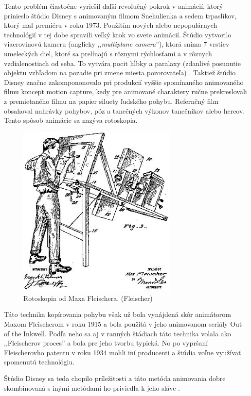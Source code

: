 Tento problém čiastočne vyriešil daľší revolučný pokrok v animácií, ktorý prinieslo štúdio Disney s animovaným filmom Snehulienka a sedem trpaslíkov, ktorý mal premiéru v roku 1973. Použitím nových alebo nepopulárnych technológií v tej dobe spravili veľký krok vo svete animácií. Štúdio vytvorilo viacrovinovú kameru (anglicky ,,\textit{multiplane camera}''), ktorá sníma 7 vrstiev umeleckých diel, ktoré sa prelínajú s rôznymi rýchlosťami a v rôznych vzdialenostiach od seba. To vytvára pocit hĺbky a paralaxy (zdanlivé posunutie objektu vzhľadom na pozadie pri zmene miesta pozorovateľa) \cite{multiplaneCam}. 
Taktiež štúdio Disney značne zakompononovalo pri produkcií vyššie spomínaného animovaného filmu koncept motion capture, kedy pre animované charaktery ručne prekreslovali z premietaného filmu na papier siluety ľudského pohybu. Refernčný film obsahoval nahrávky pohybov, póz a tanečných výkonov tanečníkov alebo hercov. Tento spôsob animácie sa nazýva rotoskopia.

\begin{figure}[!htbp]
  \centering
  \includegraphics[width=8cm]{img/Rotoscoping-by-Max-Fleischer-Fleischer.png}
  \caption{Rotoskopia od Maxa Fleischera. (Fleischer)}
  \label{rotoscopeFig}
\end{figure}

Táto technika kopírovania pohybu však už bola vynájdená skôr animátorom Maxom Fleischerom v roku 1915 a bola použitá v jeho animovanom seriály Out of the Inkwell. Podľa neho sa aj v ranných štádiach táto technika volala ako ,,Fleischerov proces'' a bola pre jeho tvorbu typická. No po vypršaní Fleischerovho patentu v roku 1934 mohli iní producenti a štúdia voľne využívať spomenutú technológiu.

Štúdio Disney sa teda chopilo príležitosti a táto metóda animovania dobre skombinovaná s inými metódami ho priviedla k jeho sláve \cite{rotoscopeHistory}.

